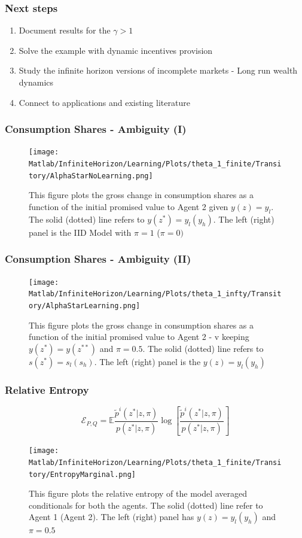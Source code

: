 \documentclass{beamer}
\theoremstyle{definition}
\begin{document}
\begin{frame}
\frametitle{Next steps}
\begin{enumerate}
\item Document results for the $\gamma > 1$  
\item Solve the example with dynamic incentives provision
\item Study the infinite horizon versions of incomplete markets - Long run wealth dynamics	
\item Connect to applications and existing literature
\end{enumerate}
\end{frame}

\begin{frame}[label=ConsSharesAmb1]
\frametitle{Consumption Shares - Ambiguity (I)}
\begin{figure}[htbp]
\centering
	  \texttt{[image: Matlab/InfiniteHorizon/Learning/Plots/theta\_1\_finite/Transitory/AlphaStarNoLearning.png]}

	\caption{\scriptsize{This figure plots the gross change in consumption shares as a function 
of the initial promised value to Agent 2 given $y(z)=y_l$. The solid (dotted) line refers to
 $y(z^*)=y_l (y_h)$. The left (right) panel is the IID Model with $\pi=1$ ($\pi=0)$}}
	\label{fig:AlphaStarNoLearning}
\end{figure} 
\hyperlink{ResultsComMarket}{\beamergotobutton{}}
\end{frame}
\begin{frame} [label=ConsSharesAmb2]
\frametitle{Consumption Shares - Ambiguity (II)}
\begin{figure}[htbp]
\centering
	  \texttt{[image: Matlab/InfiniteHorizon/Learning/Plots/theta\_1\_infty/Transitory/AlphaStarLearning.png]}

	\caption{\scriptsize{ This figure plots the gross change in consumption shares as a function 
of the initial promised value to Agent 2 - v keeping $y(z^*)=y(z^{**})$ and $\pi=0.5$. The solid (dotted) line refers to
 $s(z^*)=s_l (s_h)$. The left (right) panel is the $y(z)=y_l(y_h)$}}
	\label{fig:AlphaStarLearning}
\end{figure} 
\hyperlink{ResultsComMarket}{\beamergotobutton{}}
\end{frame}

\begin{frame}[label=RelEntropy]
\frametitle{Relative Entropy}
\small{\[\mathcal{E}_{P,Q} =  \mathbb{E} \frac{\tilde{p}^i(z^*|z,\pi)}{p(z^*|z,\pi)} \log\left[\frac{\tilde{p}^i(z^*|z,\pi)}{p(z^*|z,\pi)}\right]\]}
\begin{figure}[htbp]
\centering
	  \texttt{[image: Matlab/InfiniteHorizon/Learning/Plots/theta\_1\_finite/Transitory/EntropyMarginal.png]}

	\caption{\scriptsize{This figure plots the relative entropy of the model averaged
 conditionals for both the agents. The solid (dotted) line refer to Agent 1 (Agent 2). The left (right) panel has $y(z)=y_l (y_h)$ and $\pi=0.5$ }}
 
	\label{fig:EntropyMarginal}
\end{figure} 
\hyperlink{ResultsComMarket}{\beamergotobutton{}}
\end{frame}
\end{document}
